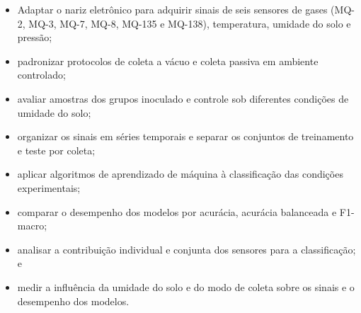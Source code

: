 \begin{itemize}
    \item Adaptar o nariz eletrônico para adquirir sinais de seis sensores de gases (MQ-2, MQ-3, MQ-7, MQ-8, MQ-135 e MQ-138), temperatura, umidade do solo e pressão;

    \item padronizar protocolos de coleta a vácuo e coleta passiva em ambiente controlado;

    \item avaliar amostras dos grupos inoculado e controle sob diferentes condições de umidade do solo;

    \item organizar os sinais em séries temporais e separar os conjuntos de treinamento e teste por coleta;

    \item aplicar algoritmos de aprendizado de máquina à classificação das condições experimentais;

    \item comparar o desempenho dos modelos por acurácia, acurácia balanceada e F1-macro;

    \item analisar a contribuição individual e conjunta dos sensores para a classificação; e

    \item medir a influência da umidade do solo e do modo de coleta sobre os sinais e o desempenho dos modelos.
\end{itemize}
